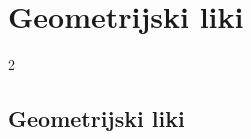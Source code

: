 \section{Geometrijski liki}

\begin{frame}
    \sectionpage
\end{frame}

\begin{frame}
    \begin{multicols}{2}
    \end{multicols}
\end{frame}



    \subsection{Geometrijski liki}